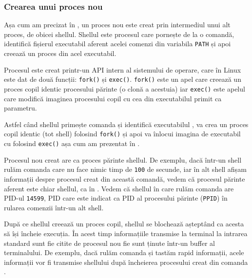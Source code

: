 \subsubsection{Crearea unui proces nou}
\label{sec:cli:shell:working:new-process}

Așa cum am precizat în , un proces nou este creat prin intermediul unui alt
proces, de obicei shellul. Shellul este procesul care pornește de la o
comandă, identifică fișierul executabil aferent acelei comenzi din variabila
\texttt{PATH} și apoi creează un proces din acel executabil.

Procesul este creat printr-un API intern al sistemului de operare, care în Linux
este dat de două funcții: \texttt{fork()} și \texttt{exec()}. \texttt{fork()} este un apel care creează un
proces copil identic procesului părinte (o clonă a acestuia) iar \texttt{exec()} este
apelul care modifică imaginea procesului copil cu cea din executabilul primit ca
parametru.

Astfel când shellul primește comanda  și identifică executabilul , va
crea un proces copil identic (tot shell) folosind \texttt{fork()} și apoi va înlocui
imagina de executabil cu  folosind \texttt{exec()} așa cum am prezentat în .

Procesul nou creat are ca proces părinte shellul. De exemplu, dacă într-un
shell rulăm comanda  care nu face nimic timp de \texttt{100} de secunde, iar în
alt shell afișam informații despre procesul creat din această comandă, vedem că
procesul părinte aferent este chiar shellul, ca în . Vedem că shellul în care rulăm comanda  are PID-ul \texttt{14599}, PID care este indicat ca PID al procesului părinte (\texttt{PPID}) în rularea comenzii  într-un alt shell.


După ce shellul creează un proces copil, shellul se blochează așteptând ca
acesta să își încheie execuția. În acest timp informațiile transmise la terminal
la intrarea standard sunt fie citite de procesul nou fie sunt ținute într-un
buffer al terminalului. De exemplu, dacă rulăm comanda  și tastăm rapid
informații, acele informații vor fi transmise shellului după încheierea
procesului creat din comanda .

